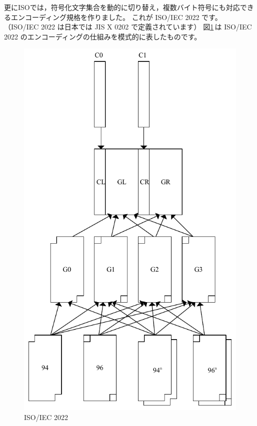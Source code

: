 \documentclass[a4j,10pt,fleqn,uplatex]{jsarticle}
\begin{document}
更にISOでは，符号化文字集合を動的に切り替え，複数バイト符号にも対応できるエンコーディング規格を作りました。
これが ISO/IEC 2022 です。
（ISO/IEC 2022 は日本では JIS X 0202 で定義されています）
図\ref{fig:ISO2022-8}\,は ISO/IEC 2022 のエンコーディングの仕組みを模式的に表したものです。

\begin{figure}[htp]
\begin{center}
\includegraphics[width=7.5truecm,clip]{iso2022-8.pdf}
\end{center}
\caption{ISO/IEC 2022} \label{fig:ISO2022-8}
\end{figure}
\end{document}
